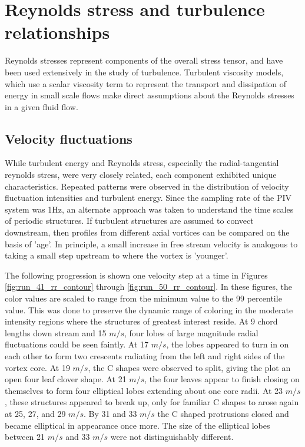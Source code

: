 \section{Reynolds stress and turbulence relationships}

Reynolds stresses represent components of the overall stress tensor, and have 
been used extensively in the study of turbulence. Turbulent viscosity models, 
which use a scalar viscosity term to represent the transport and dissipation of 
energy in small scale flows make direct assumptions about the Reynolds stresses 
in a given fluid flow. 

\clearpage
\subsection{Velocity fluctuations}

While turbulent energy and Reynolds stress, especially the radial-tangential 
reynolds stress, were very closely related, each component exhibited unique 
characteristics. Repeated patterns were observed in the distribution of 
velocity fluctuation intensities and turbulent energy. Since the sampling rate 
of the PIV system was 1Hz, an alternate approach was taken to understand the 
time scales of periodic structures. If turbulent structures are assumed to 
convect downstream, then profiles from different axial vortices can be compared 
on the basis of 'age'. In principle, a small increase in free stream velocity 
is analogous to taking a small step upstream to where the vortex is 'younger'. 

The following progression is shown one velocity step at 
a time in Figures \ref{fig:run_41_rr_contour} through 
\ref{fig:run_50_rr_contour}. In these figures, the color values are scaled to 
range from the minimum value to the 99 percentile value. This was done to 
preserve the dynamic range of coloring in the moderate intensity regions where 
the structures of greatest interest reside.
At 9 chord lengths down stream and 15 $m/s$, four lobes of 
large magnitude radial fluctuations could be seen faintly. At 17 $m/s$, the 
lobes appeared to turn in on each other to form two crescents radiating from 
the left and right sides of the vortex core. At 19 $m/s$, the C shapes were 
observed to split, giving the plot an open four leaf clover shape. At 21 $m/s$, 
the four leaves appear to finish closing on themselves to form four 
elliptical lobes extending about one core radii. At 23 $m/s$, these 
structures appeared to break up, only for familiar C shapes to arose again at 
25, 27, and 29 $m/s$. By 31 and 33 $m/s$ the C shaped protrusions closed and 
became elliptical in appearance once more.  The size of the 
elliptical lobes between 21 $m/s$ and 33 $m/s$ were not distinguishably 
different. 

